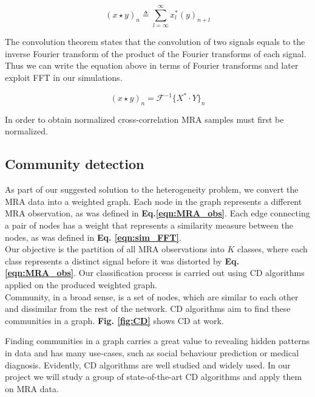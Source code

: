 \begin{equation}
\label{eqn:sim_def}
(x \star y)_n \triangleq \sum_{l=\infty}^{\infty}x^*_l(y)_{n+l}
\end{equation}

The convolution theorem states that the convolution of two signals  equals to the inverse Fourier transform of the product of the Fourier transforms of each signal. Thus we can write the equation above in terms of Fourier transforms and later exploit \acrshort{FFT} in our simulations.

\begin{equation}
\label{eqn:sim_FFT}
(x \star y)_n = \mathcal{F}^{-1}\lbrace X^* \cdot Y {\rbrace}_n
\end{equation}

In order to obtain normalized cross-correlation \acrshort{MRA} samples must first be normalized.

\clearpage

\subsection{Community detection}

As part of our suggested solution to the heterogeneity problem, we convert the \acrshort{MRA} data into a weighted graph. Each node in the graph represents a different \acrshort{MRA} observation, as was defined in \textbf{Eq.\ref{eqn:MRA_obs}}. Each edge connecting a pair of nodes has a weight that represents a similarity measure between the nodes, as was defined in \textbf{Eq. \ref{eqn:sim_FFT}}.\\

Our objective is the partition of all \acrshort{MRA} observations into $K$ classes, where each class represents a distinct signal before it was distorted by \textbf{Eq. \ref{eqn:MRA_obs}}. Our classification process is carried out using \acrfull{CD} algorithms applied on the produced weighted graph.\\

Community, in a broad sense, is a set of nodes, which are similar to each other and dissimilar from the rest of the network. \acrfull{CD} algorithms aim to find these communities in a graph. \textbf{Fig. \ref{fig:CD}} shows \acrshort{CD} at work.

Finding communities in a graph carries a great value to revealing hidden patterns in data and has many use-cases, such as social behaviour prediction \cite{zachary1976} or medical diagnosis\cite{guimera2005}. Evidently, \acrlong{CD} algorithms are well studied and widely used. In our project we will study a group of state-of-the-art \acrshort{CD} algorithms and apply them on \acrshort{MRA} data.

